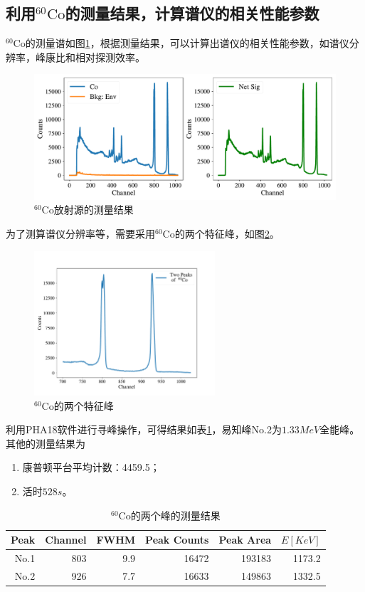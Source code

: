 \documentclass{article}
\begin{document}
\subsection{利用$^{60}\text{Co}$的测量结果，计算谱仪的相关性能参数}
$^{60}\text{Co}$的测量谱如图\ref{fig:60Co}，根据测量结果，可以计算出谱仪的相关性能参数，如谱仪分辨率，峰康比和相对探测效率。
\begin{figure}[htbp]
    \centering
    \includegraphics[width=\textwidth]{../plots/Co_net.pdf}
    \caption{$^{60}\text{Co}$放射源的测量结果\label{fig:60Co}}
\end{figure}
为了测算谱仪分辨率等，需要采用$^{60}\text{Co}$的两个特征峰，如图\ref{fig:60Co2Peak}。
\begin{figure}
    \centering
    \includegraphics[width=0.6\textwidth]{../plots/Co_two_Peak.pdf}
    \caption{$^{60}\text{Co}$的两个特征峰\label{fig:60Co2Peak}}
\end{figure}
利用PHA18软件进行寻峰操作，可得结果如表\ref{tab:60Co}，易知峰No.2为$1.33\si{MeV}$全能峰。其他的测量结果为
\begin{enumerate}
    \item 康普顿平台平均计数：4459.5；
    \item 活时$\si{528 s}$。
\end{enumerate}
\begin{table}[htbp]
    \centering
    \caption{$^{60}\text{Co}$的两个峰的测量结果\label{tab:60Co}}
    \begin{tabular}{rrrrrr}
\toprule
Peak &  Channel &  FWHM &  Peak Counts &  Peak Area & $E[\si{KeV}]$\\
\midrule
No.1    &      803 &   9.9 &        16472 &     193183 & 1173.2 \\
No.2    &      926 &   7.7 &        16633 &     149863 & 1332.5\\
\bottomrule
\end{tabular}
\end{table}
\end{document}
